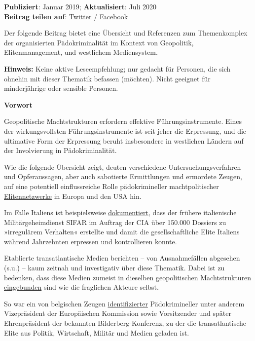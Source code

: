 \textbf{Publiziert}: Januar 2019; \textbf{Aktualisiert}: Juli 2020\\
\textbf{Beitrag teilen auf}:
\href{https://twitter.com/intent/tweet?url=https://swprs.org/geopolitik-und-paedokriminalitaet/}{Twitter}
/
\href{https://www.facebook.com/share.php?u=https://swprs.org/geopolitik-und-paedokriminalitaet/}{Facebook}

Der folgende Beitrag bietet eine Übersicht und Referenzen zum
Themenkomplex der organisierten Pädokriminalität im Kontext von
Geopolitik, Elitenmanagement, und westlichem Mediensystem.

\textbf{Hinweis:} Keine aktive Leseempfehlung; nur gedacht für Personen,
die sich ohnehin mit dieser Themati­k befassen (möchten). Nicht geeignet
für minderjährige oder sensible Personen.

\textbf{Vorwort}

Geopolitische Machtstrukturen erfordern effektive Führungsinstrumente.
Eines der wirkungs­vollsten Führungs­instrumente ist seit jeher die
Erpressung, und die ultimative Form der Erpressung beruht insbesondere
in westlichen Ländern auf der Involvierung in Pädokriminalität.

Wie die folgende Übersicht zeigt, deuten verschiedene
Untersuchungsverfahren und Opferaussagen, aber auch sabotierte
Ermittlungen und ermordete Zeugen, auf eine potentiell einflussreiche
Rolle pädo­krimineller machtpolitischer
\href{https://isgp-studies.com/belgian-x-dossiers-of-the-dutroux-affair}{Elitennetzwerke}
in Europa und den USA hin.

Im Falle Italiens ist beispielsweise
\href{https://archive.org/details/pdfy-cJFgKNCmJiUKmCF_/page/n83/mode/2up}{dokumentiert},
dass der frühere italienische Militärgeheim­dienst SIFAR im Auftrag der
CIA über 150.000 Dossiers zu »irregulärem Verhalten« erstellte und damit
die ge­sell­schaf­tliche Elite Italiens während Jahrzehnten erpressen
und kontrollieren konnte.

Etablierte transatlantische Medien berichten -- von Ausnahmefällen
abgesehen (s.u.) -- kaum zeitnah und investigativ über diese Thematik.
Dabei ist zu bedenken, dass diese Medien zumeist in dieselben
geopolitischen Machtstrukturen
\href{https://swprs.org/netzwerk-medien-deutschland/}{eingebunden} sind
wie die fraglichen Akteure selbst.

So war ein von belgischen Zeugen
\href{https://www.pdf-archive.com/2020/07/18/dutroux-x-dossiers-accused-overview-2007-isgp/dutroux-x-dossiers-accused-overview-2007-isgp.pdf}{identifizierter}
Pädokrimineller unter anderem Vizepräsident der Europäischen Kommission
sowie Vorsitzender und später Ehrenpräsident der bekannten
Bilder­berg-Kon­fe­renz, zu der die transatlantische Elite aus Politik,
Wirtschaft, Militär und Medien geladen ist.

